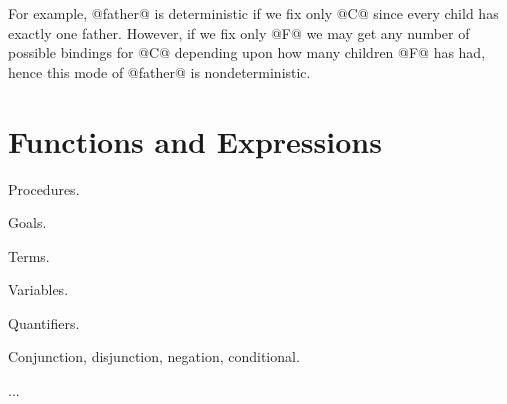 For example, @father@ is deterministic if we fix only @C@ since every child
has exactly one father.  However, if we fix only @F@ we may get any
number of possible bindings for @C@ depending upon how many children @F@
has had, hence this mode of @father@ is nondeterministic.



\section{Functions and Expressions}





Procedures.

Goals.

Terms.

Variables.

Quantifiers.

Conjunction, disjunction, negation, conditional.

...



